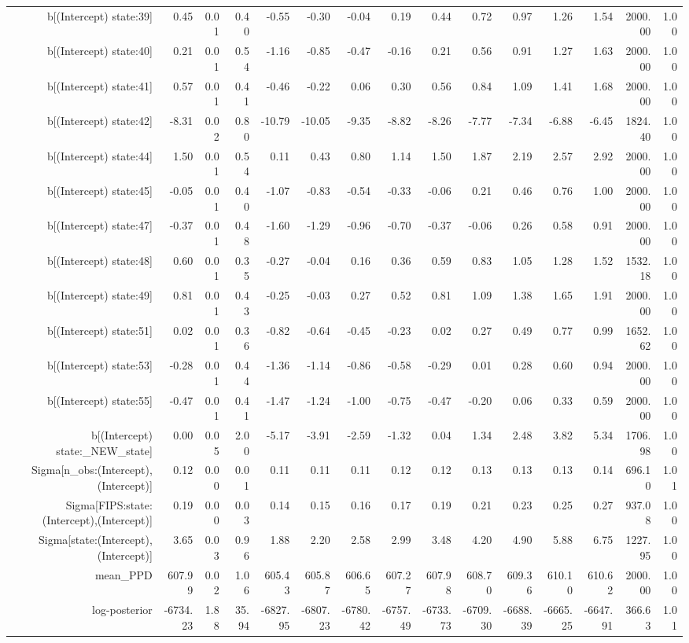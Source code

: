 \begin{table}[ht]
\begin{tabular}{rrrrrrrrrrrrrrr}
  b[(Intercept) state:39] & 0.45 & 0.01 & 0.40 & -0.55 & -0.30 & -0.04 & 0.19 & 0.44 & 0.72 & 0.97 & 1.26 & 1.54 & 2000.00 & 1.00 \\ 
  b[(Intercept) state:40] & 0.21 & 0.01 & 0.54 & -1.16 & -0.85 & -0.47 & -0.16 & 0.21 & 0.56 & 0.91 & 1.27 & 1.63 & 2000.00 & 1.00 \\ 
  b[(Intercept) state:41] & 0.57 & 0.01 & 0.41 & -0.46 & -0.22 & 0.06 & 0.30 & 0.56 & 0.84 & 1.09 & 1.41 & 1.68 & 2000.00 & 1.00 \\ 
  b[(Intercept) state:42] & -8.31 & 0.02 & 0.80 & -10.79 & -10.05 & -9.35 & -8.82 & -8.26 & -7.77 & -7.34 & -6.88 & -6.45 & 1824.40 & 1.00 \\ 
  b[(Intercept) state:44] & 1.50 & 0.01 & 0.54 & 0.11 & 0.43 & 0.80 & 1.14 & 1.50 & 1.87 & 2.19 & 2.57 & 2.92 & 2000.00 & 1.00 \\ 
  b[(Intercept) state:45] & -0.05 & 0.01 & 0.40 & -1.07 & -0.83 & -0.54 & -0.33 & -0.06 & 0.21 & 0.46 & 0.76 & 1.00 & 2000.00 & 1.00 \\ 
  b[(Intercept) state:47] & -0.37 & 0.01 & 0.48 & -1.60 & -1.29 & -0.96 & -0.70 & -0.37 & -0.06 & 0.26 & 0.58 & 0.91 & 2000.00 & 1.00 \\ 
  b[(Intercept) state:48] & 0.60 & 0.01 & 0.35 & -0.27 & -0.04 & 0.16 & 0.36 & 0.59 & 0.83 & 1.05 & 1.28 & 1.52 & 1532.18 & 1.00 \\ 
  b[(Intercept) state:49] & 0.81 & 0.01 & 0.43 & -0.25 & -0.03 & 0.27 & 0.52 & 0.81 & 1.09 & 1.38 & 1.65 & 1.91 & 2000.00 & 1.00 \\ 
  b[(Intercept) state:51] & 0.02 & 0.01 & 0.36 & -0.82 & -0.64 & -0.45 & -0.23 & 0.02 & 0.27 & 0.49 & 0.77 & 0.99 & 1652.62 & 1.00 \\ 
  b[(Intercept) state:53] & -0.28 & 0.01 & 0.44 & -1.36 & -1.14 & -0.86 & -0.58 & -0.29 & 0.01 & 0.28 & 0.60 & 0.94 & 2000.00 & 1.00 \\ 
  b[(Intercept) state:55] & -0.47 & 0.01 & 0.41 & -1.47 & -1.24 & -1.00 & -0.75 & -0.47 & -0.20 & 0.06 & 0.33 & 0.59 & 2000.00 & 1.00 \\ 
  b[(Intercept) state:\_NEW\_state] & 0.00 & 0.05 & 2.00 & -5.17 & -3.91 & -2.59 & -1.32 & 0.04 & 1.34 & 2.48 & 3.82 & 5.34 & 1706.98 & 1.00 \\ 
  Sigma[n\_obs:(Intercept),(Intercept)] & 0.12 & 0.00 & 0.01 & 0.11 & 0.11 & 0.11 & 0.12 & 0.12 & 0.13 & 0.13 & 0.13 & 0.14 & 696.10 & 1.01 \\ 
  Sigma[FIPS:state:(Intercept),(Intercept)] & 0.19 & 0.00 & 0.03 & 0.14 & 0.15 & 0.16 & 0.17 & 0.19 & 0.21 & 0.23 & 0.25 & 0.27 & 937.08 & 1.00 \\ 
  Sigma[state:(Intercept),(Intercept)] & 3.65 & 0.03 & 0.96 & 1.88 & 2.20 & 2.58 & 2.99 & 3.48 & 4.20 & 4.90 & 5.88 & 6.75 & 1227.95 & 1.00 \\ 
  mean\_PPD & 607.99 & 0.02 & 1.06 & 605.43 & 605.87 & 606.65 & 607.27 & 607.98 & 608.70 & 609.36 & 610.10 & 610.62 & 2000.00 & 1.00 \\ 
  log-posterior & -6734.23 & 1.88 & 35.94 & -6827.95 & -6807.23 & -6780.42 & -6757.49 & -6733.73 & -6709.30 & -6688.39 & -6665.25 & -6647.91 & 366.63 & 1.01 \\ 
   \hline
\end{tabular}
\end{table}
